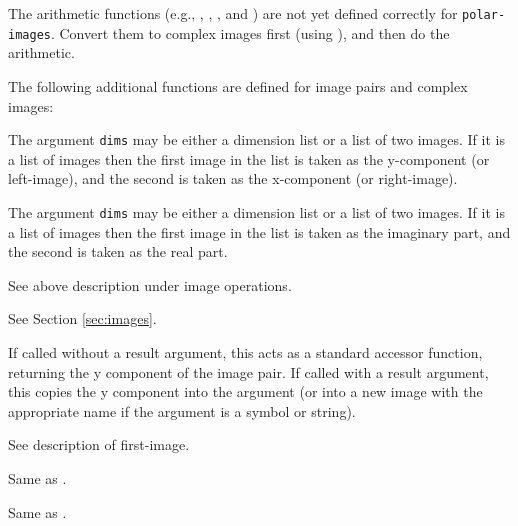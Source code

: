 The arithmetic functions (e.g., , , , and
) are not yet defined correctly for {\tt polar-images}.
Convert them to complex images first (using ),
and then do the arithmetic.

The following additional functions are defined for image pairs and
complex images:
\begin{description}
\item{}
The argument {\tt dims} may be either a dimension list or a list of two
images.  If it is a list of images then the first image in the list is
taken as the y-component (or left-image), and the second is taken as
the x-component (or right-image).

\item{}
The argument {\tt dims} may be either a dimension list or a list of
two images.  If it is a list of images then the first image in the
list is taken as the imaginary part, and the second is taken as the
real part.

\item{}

\item{}
See above description under image operations. 

\item{}
\item{}
\item{}
See Section \ref{sec:images}.

\item{}
If called without a result argument, this acts as a standard accessor
function, returning the y component of the image pair.  If called with
a result argument, this copies the y component into the argument (or
into a new image with the appropriate name if the argument is a symbol
or string).

\item{}
See description of first-image.

\item{}
Same as .

\item{}
Same as .


\end{description}
